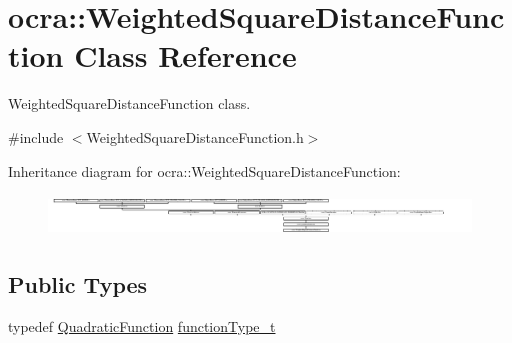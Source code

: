 \hypertarget{classocra_1_1WeightedSquareDistanceFunction}{}\section{ocra\+:\+:Weighted\+Square\+Distance\+Function Class Reference}
\label{classocra_1_1WeightedSquareDistanceFunction}


Weighted\+Square\+Distance\+Function class.  




{\ttfamily \#include $<$Weighted\+Square\+Distance\+Function.\+h$>$}

Inheritance diagram for ocra\+:\+:Weighted\+Square\+Distance\+Function\+:\begin{figure}[H]
\begin{center}
\leavevmode
\includegraphics[height=1.082126cm]{d2/d31/classocra_1_1WeightedSquareDistanceFunction}
\end{center}
\end{figure}
\subsection*{Public Types}
\begin{DoxyCompactItemize}
\item 
typedef \hyperlink{classocra_1_1QuadraticFunction}{Quadratic\+Function} \hyperlink{classocra_1_1WeightedSquareDistanceFunction_ab8fcee2e8ec81e8790f3d00b1d541d9a}{function\+Type\+\_\+t}
\end{DoxyCompactItemize}
